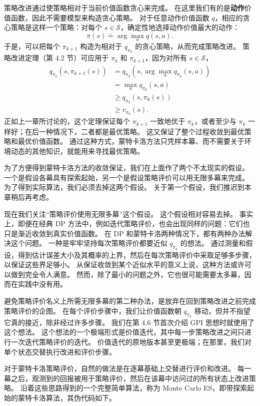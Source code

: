 \documentclass[UTF8, 12pt, fontset=fandol, oneside]{ctexart}
\begin{document}
策略改进通过使策略相对于当前价值函数贪心来完成。
在这里我们有的是\textbf{动作}价值函数，因此不需要模型来构造贪心策略。
对于任意动作价值函数 $q$，相应的贪心策略是这样一个策略：对每个 $s\in\mathcal{S}$，确定性地选择动作价值最大的动作：
\begin{equation}
\pi(s)\doteq \arg\max_a q(s,a).
\end{equation}
于是，可以把每个 $\pi_{k+1}$ 构造为相对于 $q_{\pi_k}$ 的贪心策略，从而完成策略改进。
策略改进定理（第 4.2 节）可应用于 $\pi_k$ 和 $\pi_{k+1}$，因为对所有 $s\in\mathcal{S}$，
\[
\begin{aligned}
q_{\pi_k}(s,\pi_{k+1}(s))
&= q_{\pi_k}\!\left(s,\arg\max_a q_{\pi_k}(s,a)\right)\\
&= \max_a q_{\pi_k}(s,a)\\
&\ge q_{\pi_k}(s,\pi_k(s))\\
&\ge v_{\pi_k}(s).
\end{aligned}
\]
正如上一章所讨论的，这个定理保证每个 $\pi_{k+1}$ 一致地优于 $\pi_k$，或者至少与 $\pi_k$ 一样好；在后一种情况下，二者都是最优策略。
这又保证了整个过程收敛到最优策略和最优价值函数。
通过这种方式，蒙特卡洛方法只凭样本幕、而不需要关于环境动态的其他知识，就能用来寻找最优策略。

为了方便得到蒙特卡洛方法的收敛保证，我们在上面作了两个不太现实的假设。
一个是假设各幕具有探索起始，另一个是假设策略评价可以用无限多幕来完成。
为了得到实际算法，我们必须去掉这两个假设。
关于第一个假设，我们推迟到本章稍后再考虑。

现在我们关注“策略评价使用无限多幕”这个假设。
这个假设相对容易去掉。
事实上，即便在经典 DP 方法中，例如迭代策略评价，也会出现同样的问题：它们也只是渐近收敛到真实价值函数。
在 DP 和蒙特卡洛两种情况下，都有两种办法解决这个问题。
一种是牢牢坚持每次策略评价都要近似 $q_{\pi_k}$ 的想法。
通过测量和假设，得到估计误差大小及其概率的上界，然后在每次策略评价中采取足够多步骤，以保证这些界足够小。
从保证收敛到某个近似水平的意义上说，这种方法或许可以做到完全令人满意。
然而，除了最小的问题之外，它也很可能需要太多幕，因而在实践中没有用。

避免策略评价名义上所需无限多幕的第二种办法，是放弃在回到策略改进之前完成策略评价的企图。
在每个评价步骤中，我们让价值函数朝 $q_{\pi_k}$ 移动，但并不指望它真的接近，除非经过许多步骤。
我们在第 4.6 节首次介绍 GPI 思想时就使用了这个想法。
这个想法的一个极端形式是价值迭代，其中每一步策略改进之间只进行一次迭代策略评价的迭代。
价值迭代的原地版本甚至更极端；在那里，我们对单个状态交替执行改进和评价步骤。

对于蒙特卡洛策略评价，自然的做法是在逐幕基础上交替进行评价和改进。
每一幕之后，观测到的回报被用于策略评价，然后在该幕中访问过的所有状态上改进策略。
沿着这些思路得到的一个完整简单算法，称为 Monte Carlo ES，即带探索起始的蒙特卡洛算法，其伪代码如下。
\end{document}
